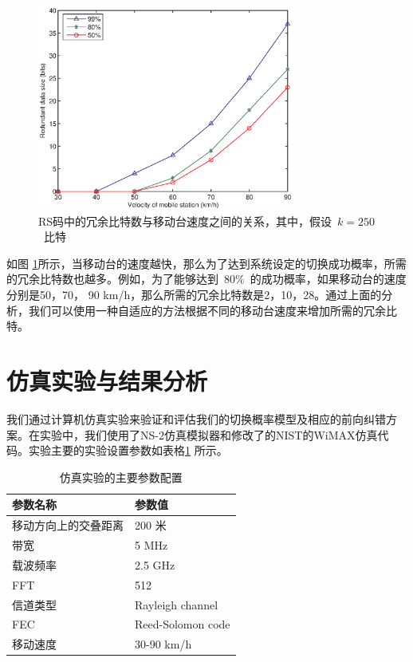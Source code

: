 \begin{figure}[t]
\begin{centering}
\includegraphics[height=6.75cm]{iccs_speed_size_theory}
\caption{RS码中的冗余比特数与移动台速度之间的关系，其中，假设~$k=250$~比特}
\label{fig:chap_iccs_handover_algorithm_AFEC_bits}
\end{centering}
\end{figure}

如图 \ref{fig:chap_iccs_handover_algorithm_AFEC_bits}所示，当移动台的速度越快，那么为了达到系统设定的切换成功概率，所需的冗余比特数也越多。例如，为了能够达到~$80\%$~的成功概率，如果移动台的速度分别是50，70， 90 km/h，那么所需的冗余比特数是2，10，28。通过上面的分析，我们可以使用一种自适应的方法根据不同的移动台速度来增加所需的冗余比特。

\section{仿真实验与结果分析}
我们通过计算机仿真实验来验证和评估我们的切换概率模型及相应的前向纠错方案。在实验中，我们使用了NS-2仿真模拟器和修改了的NIST的WiMAX仿真代码\cite{NS2_simulator}\cite{NIST_WIMAX}。实验主要的实验设置参数如表格\ref{chap_iccs_table_I} 所示。

\begin{table}[htbp]
\wuhao
\centering
\caption{仿真实验的主要参数配置}\label{chap_iccs_table_I}
\begin{tabular*}{0.99\textwidth}{p{7cm} p{7cm}} 
\toprule 
参数名称  & 参数值 \\
\midrule
移动方向上的交叠距离  & 200 米\tabularnewline 
带宽  & 5 MHz\tabularnewline 
载波频率  & 2.5 GHz\tabularnewline 
FFT   & 512\tabularnewline
信道类型  & Rayleigh channel\tabularnewline 
FEC  & Reed-Solomon code\tabularnewline 
移动速度  & 30-90 km/h\\
\bottomrule
\end{tabular*}
\end{table}

